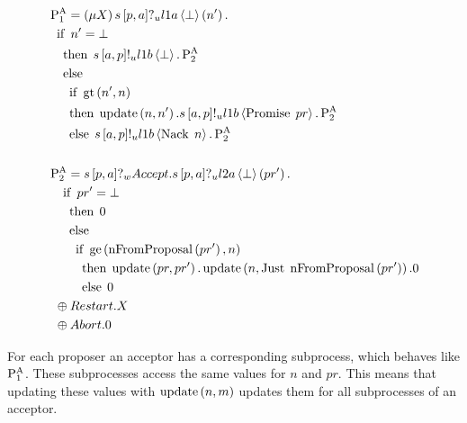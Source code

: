 
\begin{align*}
&\PaOne = \Mu{X} \ReceiveUnreliableP{s}{\ProposerIndex}{\AcceptorIndex}{\LOneA}{\bot}{n'} .\\
&\Indent{1}\If{n' = \bot}\\
&\Indent{2}\Then{\SendUnreliableP{s}{\AcceptorIndex}{\ProposerIndex}{\LOneB}{\bot}.\PaTwo}\\
&\Indent{2}\Else{\\
&\Indent{3}\If{\greaterThan{n'}{n}}\\
&\Indent{3}\Then{\update{n}{n'}}.\SendUnreliableP{s}{\AcceptorIndex}{\ProposerIndex}{\LOneB}{\Promise{pr}}.\PaTwo\\
&\Indent{3}\Else{\SendUnreliableP{s}{\AcceptorIndex}{\ProposerIndex}{\LOneB}{\Nack{n}}.\PaTwo}
}
\\\\
&\PaTwo = \ReceiveWeaklyP{s}{\ProposerIndex}{\AcceptorIndex}{\Accept . \ReceiveUnreliableP{s}{\ProposerIndex}{\AcceptorIndex}{\LTwoA}{\bot}{pr'} .\\
&\Indent{2}\If{pr' = \bot}\\
&\Indent{3}\Then{\End}\\
&\Indent{3}\Else{\\
&\Indent{4}\If{\greaterEqual{\nFromProposal{pr'}}{n}}\\
&\Indent{5}\Then{\update{pr}{pr'} . \update{n}{\Just{\nFromProposal{pr'}}}.\End}\\
&\Indent{5}\Else{\End}}\\
&\Indent{1} \oplus \Restart.X\\
&\Indent{1} \oplus \Abort.\End}
\end{align*}

For each proposer an acceptor has a corresponding subprocess, which behaves like $\operatorname{P^{A}_{1}}$.
These subprocesses access the same values for $n$ and $pr$.
This means that updating these values with $\operatorname{update} \left(n, m\right)$ updates them for all subprocesses of an acceptor.

